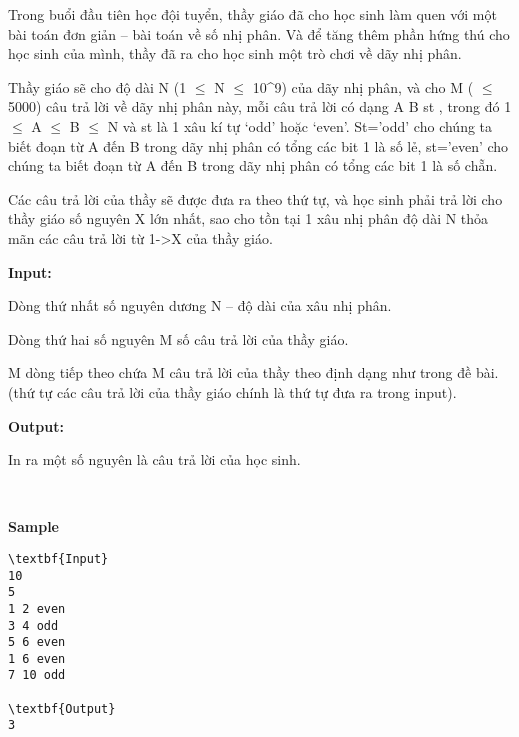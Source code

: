 

Trong buổi đầu tiên học đội tuyển, thầy giáo đã cho học sinh làm quen với một bài toán đơn giản – bài toán về số nhị phân. Và để tăng thêm phần hứng thú cho học sinh của mình, thầy đã ra cho học sinh một trò chơi về dãy nhị phân.

Thầy giáo sẽ cho độ dài N (1 $\le$ N $\le$ 10^9) của dãy nhị phân, và cho M ( $\le$ 5000) câu trả lời về dãy nhị phân này, mỗi câu trả lời có dạng A B st , trong đó 1 $\le$ A $\le$ B $\le$ N và st là 1 xâu kí tự ‘odd’ hoặc ‘even’. St=’odd’ cho chúng ta biết đoạn từ A đến B trong dãy nhị phân có tổng các bit 1 là số lẻ, st=’even’ cho chúng ta biết đoạn từ A đến B trong dãy nhị phân có tổng các bit 1 là số chẵn.

Các câu trả lời của thầy sẽ được đưa ra theo thứ tự, và học sinh phải trả lời cho thầy giáo số nguyên X lớn nhất, sao cho tồn tại 1 xâu nhị phân độ dài N thỏa mãn các câu trả lời từ 1->X của thầy giáo.

\textbf{Input:}

Dòng thứ nhất số nguyên dương N – độ dài của xâu nhị phân.

Dòng thứ hai số nguyên M số câu trả lời của thầy giáo.

M dòng tiếp theo chứa M câu trả lời của thầy theo định dạng như trong đề bài. (thứ tự các câu trả lời của thầy giáo chính là thứ tự đưa ra trong input).

\textbf{Output:}

In ra một số nguyên là câu trả lời của học sinh.

 

\textbf{Sample}
\begin{verbatim}
\textbf{Input}
10
5
1 2 even
3 4 odd
5 6 even
1 6 even
7 10 odd

\textbf{Output}
3\end{verbatim}
